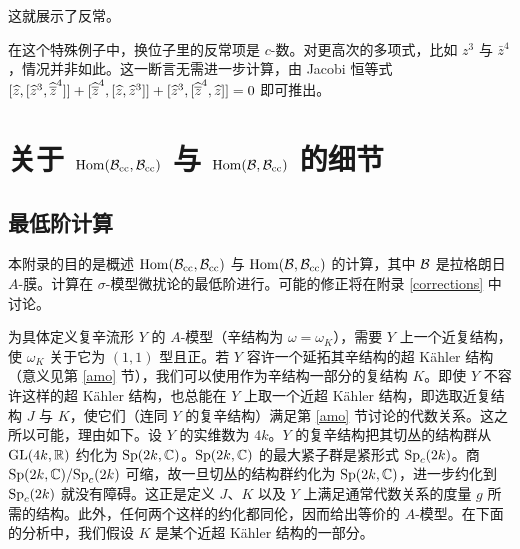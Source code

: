 这就展示了反常。

在这个特殊例子中，换位子里的反常项是 $c$-数。对更高次的多项式，比如 $z^3$ 与 $\bar z^4$，情况并非如此。这一断言无需进一步计算，由 Jacobi 恒等式
$[\widehat z,[\widehat z^3,\widehat{\overline z}^4]]+[\widehat{\overline z}^4,[\widehat z,\widehat z^3]]+[\widehat z^3,[\widehat{\overline z}^4,\widehat z]]=0$
即可推出。

\section{关于 ${\mathrm{Hom}}({\mathcal B}_{\mathrm{cc}},{\mathcal B}_{\mathrm{cc}})$ 与 ${\mathrm{Hom}}({\mathcal B},{\mathcal B}_{\mathrm{cc}})$ 的细节}\label{details}

\subsection{最低阶计算}

本附录的目的是概述 ${\mathrm{Hom}}({\mathcal B}_{\mathrm{cc}},{\mathcal B}_{\mathrm{cc}})$ 与 ${\mathrm{Hom}}({\mathcal B},{\mathcal B}_{\mathrm{cc}})$ 的计算，其中 ${\mathcal B}$ 是拉格朗日 $A$-膜。计算在 $\sigma$-模型微扰论的最低阶进行。可能的修正将在附录 \ref{corrections} 中讨论。

为具体定义复辛流形 $Y$ 的 $A$-模型（辛结构为 $\omega=\omega_K$），需要 $Y$ 上一个近复结构，使 $\omega_K$ 关于它为 $(1,1)$ 型且正。若 $Y$ 容许一个延拓其辛结构的超 Kähler 结构（意义见第 \ref{amo} 节），我们可以使用作为辛结构一部分的复结构 $K$。即使 $Y$ 不容许这样的超 Kähler 结构，也总能在 $Y$ 上取一个近超 Kähler 结构，即选取近复结构 $J$ 与 $K$，使它们（连同 $Y$ 的复辛结构）满足第 \ref{amo} 节讨论的代数关系。这之所以可能，理由如下。设 $Y$ 的实维数为 $4k$。$Y$ 的复辛结构把其切丛的结构群从 ${\mathrm{GL}}(4k,{\mathbb R})$ 约化为 ${\mathrm{Sp}}(2k,{\mathbb C})$。${\mathrm{Sp}}(2k,{\mathbb C})$ 的最大紧子群是紧形式 ${\mathrm{Sp}}_c(2k)$。商 ${\mathrm{Sp}}(2k,{\mathbb C})/{\mathrm{Sp}}_c(2k)$ 可缩，故一旦切丛的结构群约化为 ${\mathrm{Sp}}(2k,{\mathbb C})$，进一步约化到 ${\mathrm{Sp}}_c(2k)$ 就没有障碍。这正是定义 $J$、$K$ 以及 $Y$ 上满足通常代数关系的度量 $g$ 所需的结构。此外，任何两个这样的约化都同伦，因而给出等价的 $A$-模型。在下面的分析中，我们假设 $K$ 是某个近超 Kähler 结构的一部分。

